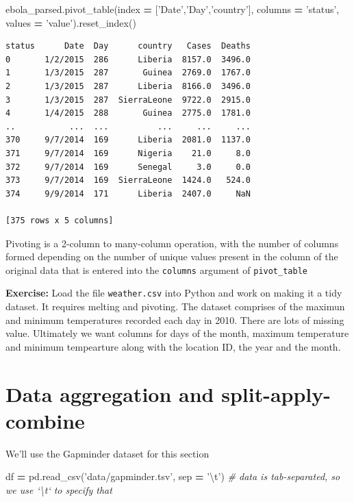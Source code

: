 \documentclass[
  letterpaper,
]{scrbook}
\newenvironment{Shaded}{\begin{snugshade}}{\end{snugshade}}
\newcommand{\CharTok}[1]{\textcolor[rgb]{0.31,0.60,0.02}{#1}}
\newcommand{\CommentTok}[1]{\textcolor[rgb]{0.56,0.35,0.01}{\textit{#1}}}
\newcommand{\NormalTok}[1]{#1}
\newcommand{\OperatorTok}[1]{\textcolor[rgb]{0.81,0.36,0.00}{\textbf{#1}}}
\newcommand{\StringTok}[1]{\textcolor[rgb]{0.31,0.60,0.02}{#1}}
\begin{document}
\begin{Shaded}
\begin{Highlighting}[]
\NormalTok{ebola_parsed.pivot_table(index }\OperatorTok{=}\NormalTok{ [}\StringTok{'Date'}\NormalTok{,}\StringTok{'Day'}\NormalTok{,}\StringTok{'country'}\NormalTok{], columns }\OperatorTok{=} \StringTok{'status'}\NormalTok{, values }\OperatorTok{=} \StringTok{'value'}\NormalTok{).reset_index()}
\end{Highlighting}
\end{Shaded}

\begin{verbatim}
status      Date  Day      country   Cases  Deaths
0       1/2/2015  286      Liberia  8157.0  3496.0
1       1/3/2015  287       Guinea  2769.0  1767.0
2       1/3/2015  287      Liberia  8166.0  3496.0
3       1/3/2015  287  SierraLeone  9722.0  2915.0
4       1/4/2015  288       Guinea  2775.0  1781.0
..           ...  ...          ...     ...     ...
370     9/7/2014  169      Liberia  2081.0  1137.0
371     9/7/2014  169      Nigeria    21.0     8.0
372     9/7/2014  169      Senegal     3.0     0.0
373     9/7/2014  169  SierraLeone  1424.0   524.0
374     9/9/2014  171      Liberia  2407.0     NaN

[375 rows x 5 columns]
\end{verbatim}

Pivoting is a 2-column to many-column operation, with the number of columns formed depending on the number of unique values present in the column of the original data that is entered into the \texttt{columns} argument of \texttt{pivot\_table}

\textbf{Exercise:} Load the file \texttt{weather.csv} into Python and work on making it a tidy dataset. It requires melting and pivoting. The dataset comprises of the maximun and minimum temperatures recorded each day in 2010. There are lots of missing value. Ultimately we want columns for days of the month, maximum temperature and minimum tempearture along with the location ID, the year and the month.

\hypertarget{data-aggregation-and-split-apply-combine}{%
\section{Data aggregation and split-apply-combine}\label{data-aggregation-and-split-apply-combine}}

We'll use the Gapminder dataset for this section

\begin{Shaded}
\begin{Highlighting}[]
\NormalTok{df }\OperatorTok{=}\NormalTok{ pd.read_csv(}\StringTok{'data/gapminder.tsv'}\NormalTok{, sep }\OperatorTok{=} \StringTok{'}\CharTok{\textbackslash{}t}\StringTok{'}\NormalTok{) }\CommentTok{# data is tab-separated, so we use `\textbackslash{}t` to specify that}
\end{Highlighting}
\end{Shaded}
\end{document}
